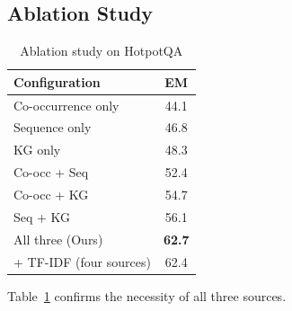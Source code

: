 \documentclass[10pt,twocolumn]{article}
\begin{document}
\subsection{Ablation Study}

\begin{table}[t]
\centering
\caption{Ablation study on HotpotQA}
\label{tab:ablation}
\small
\begin{tabular}{@{}lc@{}}
\toprule
\textbf{Configuration} & \textbf{EM} \\
\midrule
Co-occurrence only & 44.1 \\
Sequence only & 46.8 \\
KG only & 48.3 \\
\midrule
Co-occ + Seq & 52.4 \\
Co-occ + KG & 54.7 \\
Seq + KG & 56.1 \\
\midrule
All three (Ours) & \textbf{62.7} \\
+ TF-IDF (four sources) & 62.4 \\
\bottomrule
\end{tabular}
\end{table}

Table~\ref{tab:ablation} confirms the necessity of all three sources.
\end{document}

